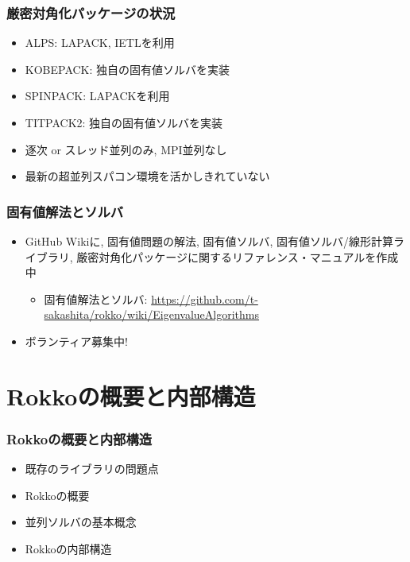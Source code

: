 \begin{frame}
  \frametitle{厳密対角化パッケージの状況}
  \begin{itemize}
    \setlength{\itemsep}{1em}
  \item ALPS: LAPACK, IETLを利用
  \item KOBEPACK: 独自の固有値ソルバを実装
  \item SPINPACK: LAPACKを利用
  \item TITPACK2: 独自の固有値ソルバを実装 \\
  \item 逐次 or スレッド並列のみ, MPI並列なし
  \item 最新の超並列スパコン環境を活かしきれていない
  \end{itemize}
\end{frame}

\begin{frame}
  \frametitle{固有値解法とソルバ}
  \begin{itemize}
    \setlength{\itemsep}{1em}
    \item GitHub Wikiに, 固有値問題の解法, 固有値ソルバ, 固有値ソルバ/線形計算ライブラリ, 厳密対角化パッケージに関するリファレンス・マニュアルを作成中
      \begin{itemize}
        \item 固有値解法とソルバ: \url{https://github.com/t-sakashita/rokko/wiki/EigenvalueAlgorithms}
      \end{itemize}
    \item ボランティア募集中!
  \end{itemize}
\end{frame}
        
\section{Rokkoの概要と内部構造}

\begin{frame}
  \frametitle{Rokkoの概要と内部構造}
  \begin{itemize}
    \setlength{\itemsep}{1em}
  \item 既存のライブラリの問題点
  \item Rokkoの概要
  \item 並列ソルバの基本概念
  \item Rokkoの内部構造
  \end{itemize}
\end{frame}

